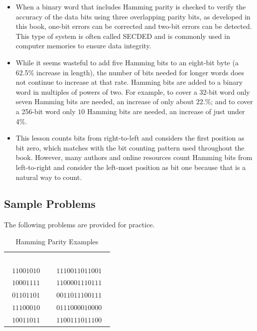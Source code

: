 \begin{itemize}
  \item When a binary word that includes Hamming parity is checked to verify the accuracy of the data bits using three overlapping parity bits, as developed in this book, one-bit errors can be corrected and two-bit errors can be detected. This type of system is often called \ac{SECDED} and is commonly used in computer memories to ensure data integrity.

  \item While it seems wasteful to add five Hamming bits to an eight-bit byte (a 62.5\% increase in length), the number of bits needed for longer words does not continue to increase at that rate. Hamming bits are added to a binary word in multiples of powers of two. For example, to cover a 32-bit word only seven Hamming bits are needed, an increase of only about 22.\%; and to cover a 256-bit word only $ 10 $ Hamming bits are needed, an increase of just under 4\%.

  \item This lesson counts bits from right-to-left and considers the first position as bit zero, which matches with the bit counting pattern used throughout the book. However, many authors and online resources count Hamming bits from left-to-right and consider the left-most position as bit one because that is a natural way to count.
\end{itemize}

\subsection{Sample Problems}
\label{CL:subsec:sample_problems_error_detection}

The following problems are provided for practice. 

\begin{table}[H]
  \sffamily
  \newcommand{\head}[1]{\textcolor{white}{\textbf{#1}}}    
  \begin{center}
    \begin{tabular}{cc} 
      \rowcolor{black!75}
      \head{8-Bit Byte} & \head{With Hamming} \\
      $ 11001010 $ & $ 1110011011001 $ \\
      $ 10001111 $ & $ 1100001110111 $ \\
      $ 01101101 $ & $ 0011011100111 $ \\
      $ 11100010 $ & $ 0111000010000 $ \\
      $ 10011011 $ & $ 1100111011100 $ \\
    \end{tabular}
  \end{center}
  \caption{Hamming Parity Examples}
  \label{CL:tab:hamming_parity_examples}
\end{table}

